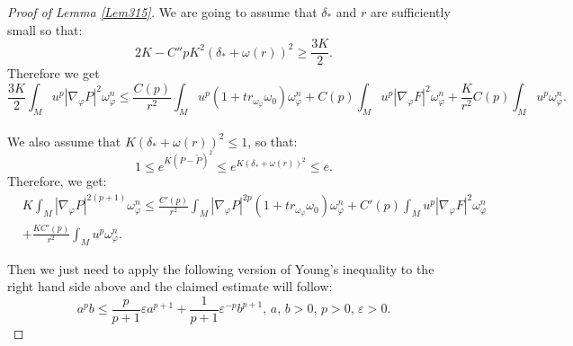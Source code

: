 \documentclass[10pt,a4paper]{amsart}
\newcommand \eps{\varepsilon}
\begin{document}
\begin{proof}[Proof of Lemma \ref{Lem315}]
We are going to assume that $\delta_*$ and $r$ are sufficiently small so that:
\begin{equation}
2K-C''pK^2(\delta_*+\omega(r))^2\ge \frac{3K}{2}.
\end{equation}
Therefore we get
\begin{equation}\label{K8}
\frac{3K}{2} \int_M u^p|\nabla_{\varphi}P|^2 \omega_{\varphi}^n \le   \frac{C(p) }{r^2}\int_M u^p (1+tr_{\omega_{\varphi}}\omega_0)\omega_\varphi^n +C(p)\int_M u^p |\nabla_\varphi F|^2\omega_\varphi^n + \frac{K}{r^2}C(p)\int_M u^p \omega_\varphi^n.
\end{equation}\\
We also assume that $K(\delta_*+\omega(r))^2\le 1$,  so that:
\begin{equation*}
1\le e^{K(P-\tilde{P})^2}\le e^{K(\delta_*+\omega(r))^2}\le e.  
\end{equation*}
Therefore,  we get:
\begin{equation*}
\begin{split}
&K\int_M|\nabla_{\varphi}P|^{2(p+1)}\omega_{\varphi}^n\le \frac{C'(p)}{r^2}\int_M|\nabla_{\varphi}P|^{2p}(1+tr_{\omega_{\varphi}}\omega_0)\omega_{\varphi}^n+C'(p)\int_Mu^p|\nabla_{\varphi}F|^2\omega_{\varphi}^n\\
&+\frac{KC'(p)}{r^2}\int_Mu^p\omega_{\varphi}^n.
\end{split}
\end{equation*}

Then we just need to apply the following version of Young's inequality to the right hand side above and the claimed estimate will follow:
\begin{equation*}
a^pb\le \frac{p}{p+1}\eps a^{p+1}+\frac{1}{p+1}\eps^{-p}b^{p+1},\,a,\,b>0,\,p>0,\,\eps>0.
\end{equation*}
\end{proof}  
\end{document}
